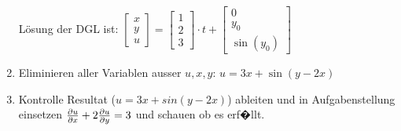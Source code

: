 \begin{enumerate}
	Lösung der DGL ist: $\begin{bmatrix}x\\y\\u\end{bmatrix}=\begin{bmatrix}1\\2\\3\end{bmatrix}\cdot t+ \begin{bmatrix}0\\y_0\\\sin(y_0)\end{bmatrix}$\\
	
	\item Eliminieren aller Variablen ausser $u,x,y$: $u=3x+\sin(y-2x)$
	\item Kontrolle
	Resultat ($u=3x+sin(y-2x)$) ableiten und in Aufgabenstellung einsetzen $\frac{\partial u}{\partial x}+2\frac{\partial u}{\partial y}=3$ und schauen ob es erf�llt.
	
\end{enumerate}


